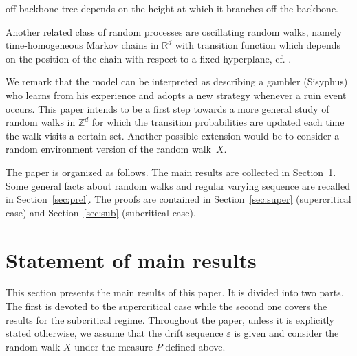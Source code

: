 \documentclass[12pt]{amsart}
\begin{document}
off-backbone tree depends on the height at which it branches off the
backbone.
\par
 Another related class
of random processes are oscillating random walks, namely
time-homogeneous Markov chains in ${{\mathbb R}}^d$ with transition function
which depends on the position of the chain with respect to a fixed
hyperplane, cf. \cite{kemperman,borovkov}.
\par
We remark that the model can be interpreted as describing a gambler
(Sisyphus) who learns from his experience and adopts a new strategy
whenever a ruin event occurs. This paper intends to be a first step
towards a more general study of random walks in $\mathbb{Z}^d$ for
which the transition probabilities are updated each time the walk
visits a certain set. Another possible extension would be to
consider a random environment version of the random walk~$X.$
\par
The paper is organized as follows. The main results are collected in
Section~\ref{sec:results}. Some general facts about random walks and
regular varying sequence are recalled in Section~\ref{sec:prel}.
The proofs are contained in Section~\ref{sec:super} (supercritical
case) and Section~\ref{sec:sub} (subcritical case).
\section{Statement of main results}
\label{sec:results} This section presents the main results of this
paper. It is divided into two parts. The first is devoted to the
supercritical case while the second one covers the results for the
subcritical regime. Throughout the paper, unless it is explicitly
stated otherwise, we assume that the drift sequence ${\varepsilon}$ is given
and consider the random walk $X$ under the measure $P$ defined
above.
\end{document}
